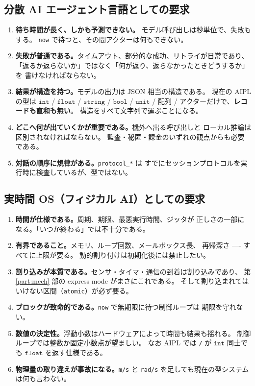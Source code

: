 \documentclass[11pt,a4paper]{ltjsarticle}
\theoremstyle{remark}
\newcommand{\ty}[1]{\ensuremath{\mathtt{#1}}}
\begin{document}
\subsection{分散 AI エージェント言語としての要求}

\begin{enumerate}
\item \textbf{待ち時間が長く、しかも予測できない。}
  モデル呼び出しは秒単位で、失敗もする。
  \texttt{now} で待つと、その間アクターは何もできない。
\item \textbf{失敗が普通である。}タイムアウト、部分的な成功、リトライが日常であり、
  「返るか返らないか」ではなく「何が返り、返らなかったときどうするか」を
  書けなければならない。
\item \textbf{結果が構造を持つ。}モデルの出力は JSON 相当の構造である。
  現在の AIPL の型は \ty{int} / \ty{float} / \ty{string} / \ty{bool} /
  \ty{unit} / 配列 / アクターだけで、\textbf{レコードも直和も無い}。
  構造をすべて文字列で運ぶことになる。
\item \textbf{どこへ何が出ていくかが重要である。}機外へ出る呼び出しと
  ローカル推論は区別されなければならない。
  監査・秘匿・課金のいずれの観点からも必要である。
\item \textbf{対話の順序に規律がある。}\texttt{protocol\_*} は
  すでにセッションプロトコルを実行時に検査しているが、型ではない。
\end{enumerate}

\subsection{実時間 OS（フィジカル AI）としての要求}

\begin{enumerate}
\item \textbf{時間が仕様である。}周期、期限、最悪実行時間、ジッタが
  正しさの一部になる。「いつか終わる」では不十分である。
\item \textbf{有界であること。}メモリ、ループ回数、メールボックス長、
  再帰深さ ---- すべてに上限が要る。
  動的割り付けは初期化後には禁止したい。
\item \textbf{割り込みが本質である。}センサ・タイマ・通信の到着は割り込みであり、
  第 \ref{part:mech} 部の express mode がまさにこれである。
  そして割り込まれてはいけない区間（\texttt{atomic}）が必ず要る。
\item \textbf{ブロックが致命的である。}\texttt{now} で無期限に待つ制御ループは
  期限を守れない。
\item \textbf{数値の決定性。}浮動小数はハードウェアによって時間も結果も揺れる。
  制御ループでは整数か固定小数点が望ましい。
  なお AIPL では \texttt{/} が \ty{int} 同士でも \ty{float} を返す仕様である。
\item \textbf{物理量の取り違えが事故になる。}\texttt{m/s} と
  \texttt{rad/s} を足しても現在の型システムは何も言わない。
\end{enumerate}
\end{document}
